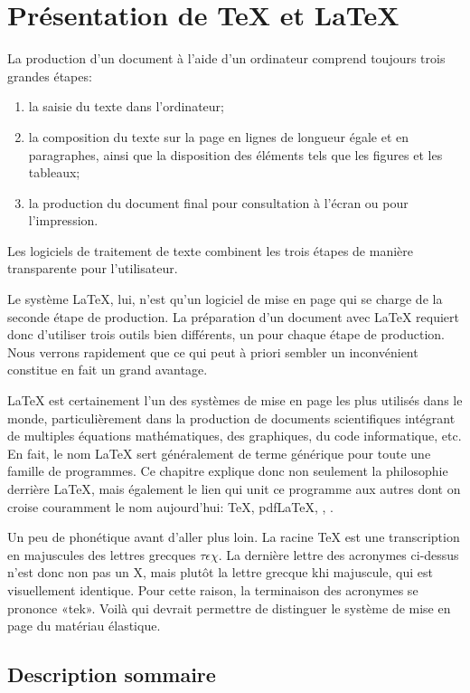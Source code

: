 \chapter{Présentation de {\TeX} et {\LaTeX}}
\label{chap:presentation}

La production d'un document à l'aide d'un ordinateur comprend toujours
trois grandes étapes:
\begin{enumerate}
\item la saisie du texte dans l'ordinateur;
\item la composition du texte sur la page en lignes de longueur égale
  et en paragraphes, ainsi que la disposition des éléments tels que les
  figures et les tableaux;
\item la production du document final pour consultation à l'écran ou
  pour l'impression.
\end{enumerate}
Les logiciels de traitement de texte combinent les trois étapes de
manière transparente pour l'utilisateur.

Le système {\LaTeX}, lui, n'est qu'un logiciel de mise en page qui se
charge de la seconde étape de production. La préparation d'un document
avec {\LaTeX} requiert donc d'utiliser trois outils bien différents,
un pour chaque étape de production. Nous verrons rapidement que ce qui
peut à priori sembler un inconvénient constitue en fait un grand
avantage.

{\LaTeX} est certainement l'un des systèmes de mise en page les plus
utilisés dans le monde, particulièrement dans la production de
documents scientifiques intégrant de multiples équations
mathématiques, des graphiques, du code informatique, etc. En fait, le
nom {\LaTeX} sert généralement de terme générique pour toute une
famille de programmes. Ce chapitre explique donc non seulement la
philosophie derrière {\LaTeX}, mais également le lien qui unit ce
programme aux autres dont on croise couramment le nom aujourd'hui:
{\TeX}, pdf{\LaTeX}, {\XeLaTeX}, {\LuaLaTeX}.

Un peu de phonétique avant d'aller plus loin. La racine {\TeX} est une
transcription en majuscules des lettres grecques $\tau\epsilon\chi$.
La dernière lettre des acronymes ci-dessus n'est donc non pas un X,
mais plutôt la lettre grecque khi majuscule, qui est visuellement
identique. Pour cette raison, la terminaison des acronymes se prononce
«tek». Voilà qui devrait permettre de distinguer le système de mise en
page du matériau élastique.


\section{Description sommaire}
\label{sec:presentation:description}

